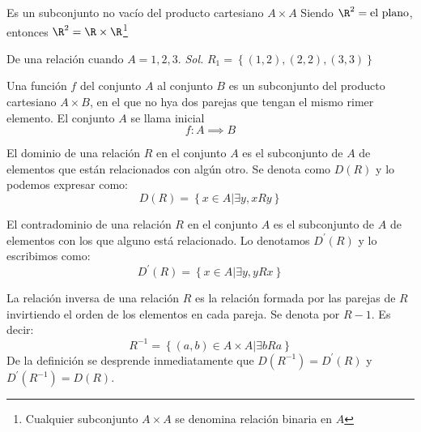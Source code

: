 \begin{definition}
	Es un subconjunto no vacío del producto cartesiano $A\times A$
	Siendo $\R^2 =\text{el plano}$, entonces $\R^2 =\R\times \R $\footnote{Cualquier subconjunto $A\times A$ se denomina relación binaria en $A$}
\end{definition}

\begin{example}
	De una relación cuando $A={1,2,3}$.
	\textit{ Sol. }
	$R_{1}= \left\{ (1,2),(2,2),(3,3)  \right\}$
\end{example}

\begin{definition}[Función]
	Una función $f$ del conjunto $A$ al conjunto $B$ es un subconjunto del producto cartesiano $A\times B$, en el que no hya dos parejas que tengan el mismo rimer elemento. El conjunto $A$ se llama inicial
	\begin{equation}
		f: A \implies B
	\end{equation}
\end{definition}

\begin{definition}[Dominio]
	El dominio de una relación $R$ en el conjunto $A$ es el subconjunto de $A$ de elementos que están relacionados con algún otro. Se denota como
	$D(R)$ y lo podemos expresar como:
	\begin{equation}
		D(R)= \left\{x\in A \vert \exists y, xRy \right\}
	\end{equation}
\end{definition}

\begin{definition}[Contradomnio]
	El contradominio de una relación $R$ en el conjunto $A$ es el subconjunto de $A$ de elementos con los que alguno está relacionado. Lo denotamos
	$D^{\prime}(R)$ y lo escribimos como:
	\begin{equation}
		D^{\prime}(R)= \left\{x\in A \vert \exists y, yRx \right\}
	\end{equation}
\end{definition}

\begin{definition}
	La relación inversa de una relación $R$ es la relación formada
	por las parejas de $R$ invirtiendo el orden de los elementos en cada pareja. Se
	denota por $R-1$. Es decir:
	\begin{equation}
		R^{-1}= \left\{(a,b)\in A\times A \vert \exists bRa \right\}
	\end{equation}
	De la definición se desprende inmediatamente que $D(R^{-1}) = D^{\prime}(R)$ y $D^{\prime}(R^{-1}) =D(R).$
\end{definition}

